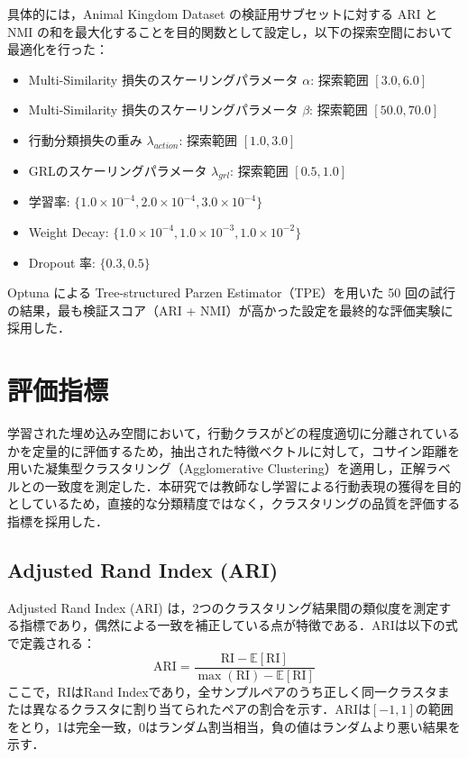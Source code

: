 具体的には，Animal Kingdom Dataset の検証用サブセットに対する ARI と NMI の和を最大化することを目的関数として設定し，以下の探索空間において最適化を行った：

\begin{itemize}
  \item Multi-Similarity 損失のスケーリングパラメータ $\alpha$: 探索範囲 $[3.0, 6.0]$
  \item Multi-Similarity 損失のスケーリングパラメータ $\beta$: 探索範囲 $[50.0, 70.0]$
  \item 行動分類損失の重み $\lambda_{action}$: 探索範囲 $[1.0, 3.0]$
  \item GRLのスケーリングパラメータ $\lambda_{grl}$: 探索範囲 $[0.5, 1.0]$
  \item 学習率: $\{1.0 \times 10^{-4}, 2.0 \times 10^{-4}, 3.0 \times 10^{-4}\}$
  \item Weight Decay: $\{1.0 \times 10^{-4}, 1.0 \times 10^{-3}, 1.0 \times 10^{-2}\}$
  \item Dropout 率: $\{0.3, 0.5\}$
\end{itemize}

Optuna による Tree-structured Parzen Estimator（TPE）を用いた 50 回の試行の結果，最も検証スコア（ARI + NMI）が高かった設定を最終的な評価実験に採用した．

\section{評価指標}
学習された埋め込み空間において，行動クラスがどの程度適切に分離されているかを定量的に評価するため，抽出された特徴ベクトルに対して，コサイン距離を用いた凝集型クラスタリング（Agglomerative Clustering）を適用し，正解ラベルとの一致度を測定した．本研究では教師なし学習による行動表現の獲得を目的としているため，直接的な分類精度ではなく，クラスタリングの品質を評価する指標を採用した．

\subsection{Adjusted Rand Index (ARI)}
Adjusted Rand Index (ARI) は，2つのクラスタリング結果間の類似度を測定する指標であり，偶然による一致を補正している点が特徴である．ARIは以下の式で定義される：
\begin{equation}
  \mathrm{ARI} = \frac{\mathrm{RI} - \mathbb{E}[\mathrm{RI}]}{\max(\mathrm{RI}) - \mathbb{E}[\mathrm{RI}]}
\end{equation}
ここで，$\mathrm{RI}$はRand Indexであり，全サンプルペアのうち正しく同一クラスタまたは異なるクラスタに割り当てられたペアの割合を示す．ARIは$[-1, 1]$の範囲をとり，1は完全一致，0はランダム割当相当，負の値はランダムより悪い結果を示す．

